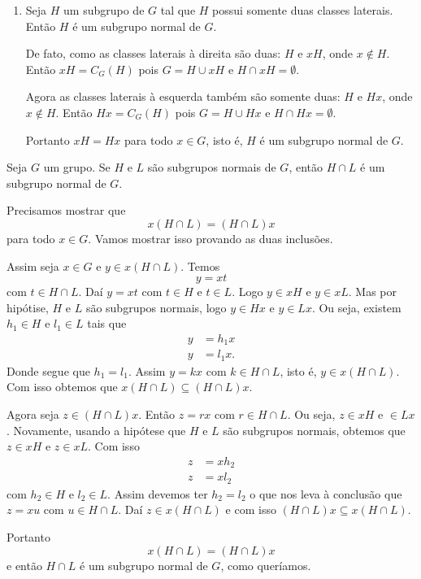 \begin{exemplos}
\begin{enumerate}[label={\arabic*})]
        \item Seja $H$ um subgrupo de $G$ tal que $H$ possui somente duas classes laterais. Então $H$ é um subgrupo normal de $G$.
        \begin{solucao}
            De fato, como as classes laterais à direita são duas: $H$ e $xH$, onde $x \notin H$. Então $xH = C_G(H)$ pois $G = H \cup xH$ e $H \cap xH = \emptyset$.

            Agora as classes laterais à esquerda também são somente duas: $H$ e $Hx$, onde $x \notin H$. Então $Hx = C_G(H)$ pois $G = H \cup Hx$ e $H \cap Hx = \emptyset$.

            Portanto $xH = Hx$ para todo $x \in G$, isto é, $H$ é um subgrupo normal de $G$.
        \end{solucao}
    \end{enumerate}
\end{exemplos}

\begin{proposicao}
    Seja $G$ um grupo. Se $H$ e $L$ são subgrupos normais de $G$, então $H \cap L$ é um subgrupo normal de $G$.
\end{proposicao}
\begin{prova}
    Precisamos mostrar que
    \[
        x(H\cap L) = (H \cap L)x
    \]
    para todo $x \in G$. Vamos mostrar isso provando as duas inclusões.

    Assim seja $x \in G$ e $y \in x(H\cap L)$. Temos
    \[
        y = xt
    \]
    com $t \in H\cap L$. Daí $y = xt$ com $t \in H$ e $t \in L$. Logo $y \in xH$ e $y \in xL$. Mas por hipótise, $H$ e $L$ são subgrupos normais, logo $y \in Hx$ e $y \in Lx$. Ou seja, existem $h_1 \in H$ e $l_1 \in L$ tais que
    \begin{align*}
        y &= h_1x\\
        y &= l_1x.
    \end{align*}
    Donde segue que $h_1 = l_1$. Assim $y = kx$ com $k \in H\cap L$, isto é, $y \in x(H\cap L)$. Com isso obtemos que $x(H\cap L) \subseteq (H\cap L)x$.

    Agora seja $z \in (H\cap L)x$. Então $z = rx$ com $r \in H\cap L$. Ou seja, $z \in xH$ e $ \in Lx$. Novamente, usando a hipótese que $H$ e $L$ são subgrupos normais, obtemos que $z \in xH$ e $z \in xL$. Com isso
    \begin{align*}
        z &= xh_2\\
        z &= xl_2
    \end{align*}
    com $h_2 \in H$ e $l_2 \in L$. Assim devemos ter $h_2 = l_2$ o que nos leva à conclusão que $z = xu$ com $u \in H\cap L$. Daí $z \in x(H \cap L)$ e com isso $(H \cap L)x \subseteq x(H \cap L)$.

    Portanto
    \[
        x(H \cap L) = (H \cap L)x
    \]
    e então $H \cap L$ é um subgrupo normal de $G$, como queríamos.
\end{prova}

